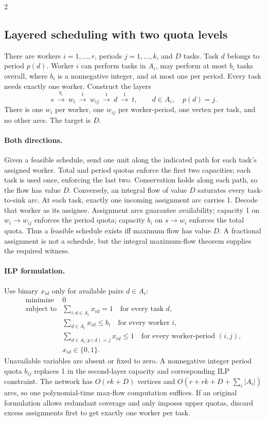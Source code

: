 \documentclass[10pt]{article}
\theoremstyle{definition}
\begin{document}
\begin{multicols*}{2}
\subsection{Layered scheduling with two quota levels}\label{nf:scheduling}
There are workers $i=1,\ldots,r$, periods $j=1,\ldots,k$, and $D$ tasks.
Task $d$ belongs to period $p(d)$. Worker $i$ can perform tasks in $A_i$,
may perform at most $b_i$ tasks overall, where $b_i$ is a nonnegative integer, and at most one per period.
Every task needs exactly one worker. Construct the layers
\[
 s\ \xrightarrow{\ b_i\ }\ w_i
 \ \xrightarrow{\ 1\ }\ w_{ij}
 \ \xrightarrow{\ 1\ }\ d
 \ \xrightarrow{\ 1\ }\ t,
 \qquad d\in A_i,\quad p(d)=j.
\]
There is one $w_i$ per worker, one $w_{ij}$ per worker-period, one vertex per
task, and no other arcs. The target is $D$.

\paragraph{Both directions.}
Given a feasible schedule, send one unit along the indicated path for each
task's assigned worker. Total and period quotas enforce the first two
capacities; each task is used once, enforcing the last two. Conservation
holds along each path, so the flow has value $D$.
Conversely, an integral flow of value $D$ saturates every task-to-sink arc.
At each task, exactly one incoming assignment arc carries 1. Decode that
worker as its assignee. Assignment arcs guarantee availability; capacity 1
on $w_i\to w_{ij}$ enforces the period quota; capacity $b_i$ on $s\to w_i$
enforces the total quota. Thus a feasible schedule exists iff maximum flow
has value $D$. A fractional assignment is not a schedule, but the integral
maximum-flow theorem supplies the required witness.

\paragraph{ILP formulation.}
Use binary $x_{id}$ only for available pairs $d\in A_i$:
\[
\begin{array}{rl}
 \text{minimize}&0\\[1mm]
 \text{subject to}&\displaystyle\sum_{i:d\in A_i}x_{id}=1
                    \quad\text{for every task }d,\\[2mm]
 &\displaystyle\sum_{d\in A_i}x_{id}\le b_i
                    \quad\text{for every worker }i,\\[2mm]
 &\displaystyle\sum_{d\in A_i:p(d)=j}x_{id}\le1
                    \quad\text{for every worker-period }(i,j),\\[2mm]
 &x_{id}\in\{0,1\}.
\end{array}
\]
Unavailable variables are absent or fixed to zero. A nonnegative integer period quota $b_{ij}$
replaces 1 in the second-layer capacity and corresponding ILP constraint.
The network has $O(rk+D)$ vertices and
$O(r+rk+D+\sum_i|A_i|)$ arcs, so one polynomial-time max-flow computation
suffices. If an original formulation allows redundant coverage and only
imposes upper quotas, discard excess assignments first to get exactly one
worker per task.


\end{multicols*}
\end{document}
